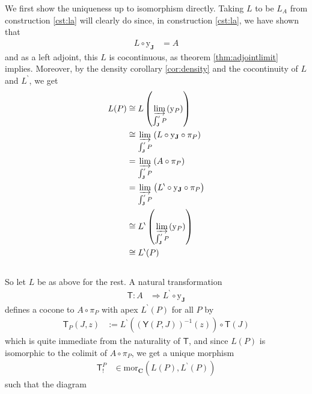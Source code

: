 \begin{prf}
We first show the uniqueness up to isomorphism directly.
Taking $L$ to be $L_{A}$ from construction \ref{cst:la} will clearly do since, in construction \ref{cst:la}, we have shown that
\begin{align*}
  L
  \circ
  \mathrm{y}_{\mathbf{J}}
  &=
  A
\end{align*}
and as a left adjoint, this $L$ is cocontinuous, as theorem \ref{thm:adjointlimit} implies.
Moreover, by the density corollary \ref{cor:density} and the cocontinuity of $L$ and $L^{\backprime}$, we get
\begin{align*}
  L(P)
  &\cong
  L
  \left(
    \varinjlim_{\int_{\mathbf{J}}^{\prime}P}(\mathrm{y}_{P})
  \right)
  \\
  &\cong
  \varinjlim_{\int_{\mathbf{J}}^{\prime}P}
  \left(
    L
    \circ
    \mathrm{y}_{\mathbf{J}}
    \circ
    \pi_{P}
  \right)
  \\
  &=
  \varinjlim_{\int_{\mathbf{J}}^{\prime}P}
  \left(
    A
    \circ
    \pi_{P}
  \right)
  \\
  &=
  \varinjlim_{\int_{\mathbf{J}}^{\prime}P}
  \left(
    L^{\backprime}
    \circ
    \mathrm{y}_{\mathbf{J}}
    \circ
    \pi_{P}
  \right)
  \\
  &\cong
  L^{\backprime}
  \left(
    \varinjlim_{\int_{\mathbf{J}}^{\prime}P}(\mathrm{y}_{P})
  \right)
  \\
  &\cong
  L^{\backprime}(P)
\end{align*}
\\
So let $L$ be as above for the rest.
A natural transformation
\begin{align*}
  \mathsf{T}
  \colon
  A
  &\Rightarrow
  L^{\backprime}
  \circ
  \mathrm{y}_{\mathbf{J}}
\end{align*}
defines a cocone to $A \circ \pi_{P}$ with apex $L^{\backprime}(P)$ for all $P$ by
\begin{align*}
  \mathsf{T}_{P}(J,z)
  &:=
  L^{\backprime}
  \left(
    (\mathsf{Y}(P,J))^{-1}(z)
  \right)
  \circ
  \mathsf{T}(J)
\end{align*}
which is quite immediate from the naturality of $\mathsf{T}$, and since $L(P)$ is isomorphic to the colimit of $A \circ \pi_{P}$, we get a unique morphism
\begin{align*}
  \mathsf{T}_{!}^{P}
  &\in
  \mathrm{mor}_{\mathbf{C}}
  \left(
    L(P),
    L^{\backprime}(P)
  \right)
\end{align*}
such that the diagram
\[
\begin{tikzcd}[sep=large]

\end{tikzcd}\]
\end{prf}
